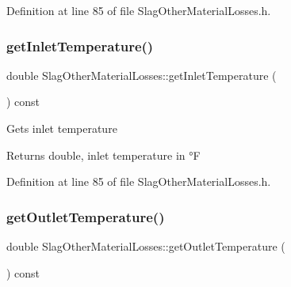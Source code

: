 Definition at line 85 of file Slag\+Other\+Material\+Losses.\+h.

\mbox{\label{class_slag_other_material_losses_aebd0f1b7d6c4bf0deb8ce8a86c5a80a7}} 
\subsubsection{\texorpdfstring{get\+Inlet\+Temperature()}{getInletTemperature()}\hspace{0.1cm}{\footnotesize\ttfamily [3/3]}}
{\footnotesize\ttfamily double Slag\+Other\+Material\+Losses\+::get\+Inlet\+Temperature (\begin{DoxyParamCaption}{ }\end{DoxyParamCaption}) const\hspace{0.3cm}{\ttfamily [inline]}}

Gets inlet temperature

\begin{DoxyReturn}{Returns}
double, inlet temperature in °F 
\end{DoxyReturn}


Definition at line 85 of file Slag\+Other\+Material\+Losses.\+h.

\mbox{\label{class_slag_other_material_losses_a1c48f1a70aaf030451b7e350f3d6cd18}} 
\subsubsection{\texorpdfstring{get\+Outlet\+Temperature()}{getOutletTemperature()}\hspace{0.1cm}{\footnotesize\ttfamily [1/3]}}
{\footnotesize\ttfamily double Slag\+Other\+Material\+Losses\+::get\+Outlet\+Temperature (\begin{DoxyParamCaption}{ }\end{DoxyParamCaption}) const\hspace{0.3cm}{\ttfamily [inline]}}

